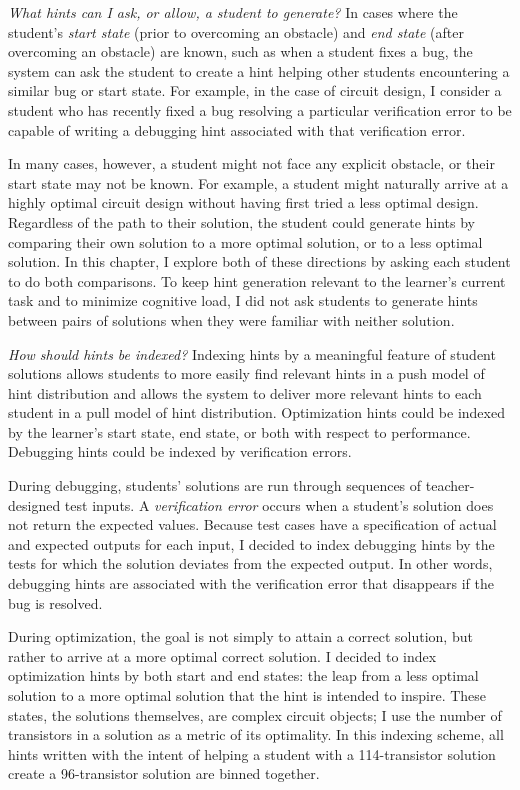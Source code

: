 {\it What hints can I ask, or allow, a student to generate?} In cases where the student's \textit{start state} (prior to overcoming an obstacle) and \textit{end state} (after overcoming an obstacle) are known, such as when a student fixes a bug, the system can ask the student to create a hint helping other students encountering a similar bug or start state. For example, in the case of circuit design, I consider a student who has recently fixed a bug resolving a particular verification error to be capable of writing a debugging hint associated with that verification error.

In many cases, however, a student might not face any explicit obstacle, or their start state may not be known. For example, a student might naturally arrive at a highly optimal circuit design without having first tried a less optimal design. Regardless of the path to their solution, the student could generate hints by comparing their own solution to a more optimal solution, or to a less optimal solution. In this chapter, I explore both of these directions by asking each student to do both comparisons. To keep hint generation relevant to the learner's current task and to minimize cognitive load, I did not ask students to generate hints between pairs of solutions when they were familiar with neither solution.

{\it How should hints be indexed?} Indexing hints by a meaningful feature of student solutions allows students to more easily find relevant hints in a push model of hint distribution and allows the system to deliver more relevant hints to each student in a pull model of hint distribution. Optimization hints could be indexed by the learner's start state, end state, or both with respect to performance. Debugging hints could be indexed by verification errors. 

During debugging, students' solutions are run through sequences of teacher-designed test inputs. A {\it verification error} occurs when a student's solution does not return the expected values. Because test cases have a specification of actual and expected outputs for each input, I decided to index debugging hints by the tests for which the solution deviates from the expected output. In other words, debugging hints are associated with the verification error that disappears if the bug is resolved. 

During optimization, the goal is not simply to attain a correct solution, but rather to arrive at a more optimal correct solution. I decided to index optimization hints by both start and end states: the leap from a less optimal solution to a more optimal solution that the hint is intended to inspire. These states, the solutions themselves, are complex circuit objects; I use the number of transistors in a solution as a metric of its optimality. In this indexing scheme, all hints written with the intent of helping a student with a 114-transistor solution create a 96-transistor solution are binned together.

